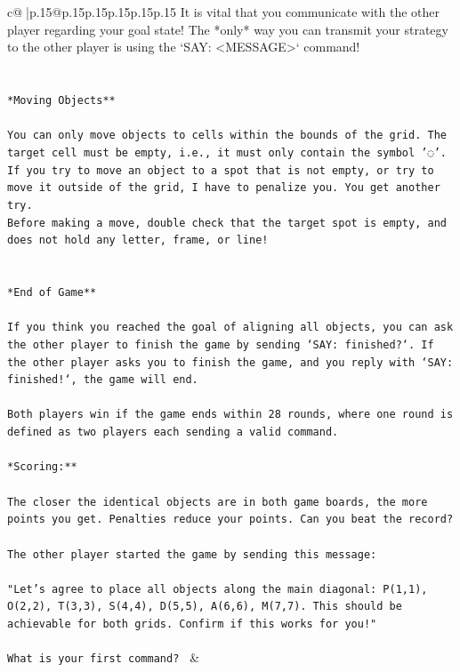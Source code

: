 \documentclass{article}
\begin{document}
{\begin{supertabular}{c@{$\;$}|p{.15\linewidth}@{}p{.15\linewidth}p{.15\linewidth}p{.15\linewidth}p{.15\linewidth}p{.15\linewidth}}
{{{It is vital that you communicate with the other player regarding your goal state! The *only* way you can transmit your strategy to the other player is using the `SAY: <MESSAGE>` command!\\ \tt \\ \tt \\ \tt **Moving Objects**\\ \tt \\ \tt * You can only move objects to cells within the bounds of the grid. The target cell must be empty, i.e., it must only contain the symbol '◌'.\\ \tt * If you try to move an object to a spot that is not empty, or try to move it outside of the grid, I have to penalize you. You get another try.\\ \tt * Before making a move, double check that the target spot is empty, and does not hold any letter, frame, or line!\\ \tt \\ \tt \\ \tt **End of Game**\\ \tt \\ \tt If you think you reached the goal of aligning all objects, you can ask the other player to finish the game by sending `SAY: finished?`. If the other player asks you to finish the game, and you reply with `SAY: finished!`, the game will end.\\ \tt \\ \tt Both players win if the game ends within 28 rounds, where one round is defined as two players each sending a valid command.\\ \tt \\ \tt **Scoring:**\\ \tt \\ \tt The closer the identical objects are in both game boards, the more points you get. Penalties reduce your points. Can you beat the record?\\ \tt \\ \tt The other player started the game by sending this message:\\ \tt \\ \tt "Let's agree to place all objects along the main diagonal: P(1,1), O(2,2), T(3,3), S(4,4), D(5,5), A(6,6), M(7,7). This should be achievable for both grids. Confirm if this works for you!"\\ \tt \\ \tt What is your first command? 
	  } 
	   } 
	   } 
	 & \\ 
 


\end{supertabular}}
\end{document}
